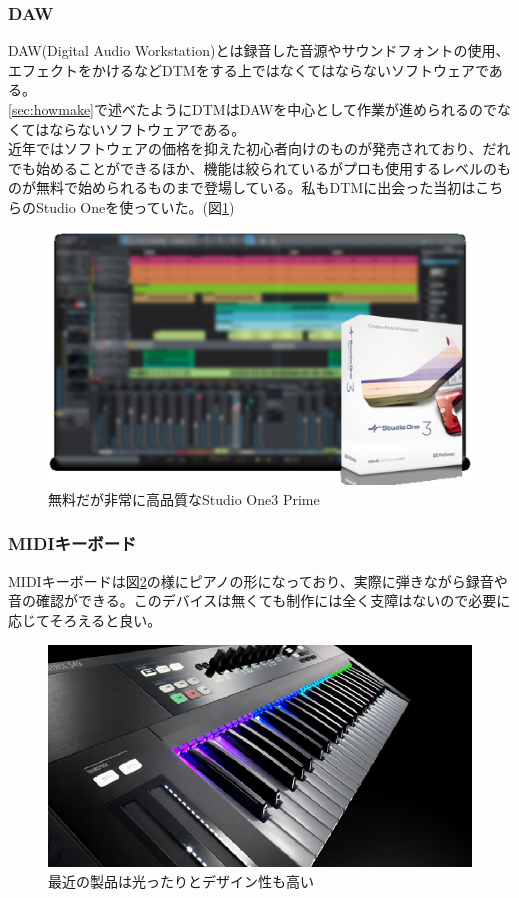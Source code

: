\documentclass[ams]{U-AizuGT}
\begin{document}
\subsubsection{DAW}
\label{sec:DAW}
DAW(Digital Audio Workstation)とは録音した音源やサウンドフォントの使用、エフェクトをかけるなどDTMをする上ではなくてはならないソフトウェアである。\\
\ref{sec:howmake}で述べたようにDTMはDAWを中心として作業が進められるのでなくてはならないソフトウェアである。\\
近年ではソフトウェアの価格を抑えた初心者向けのものが発売されており、だれでも始めることができるほか、機能は絞られているがプロも使用するレベルのものが無料で始められるものまで登場している。私もDTMに出会った当初はこちらのStudio Oneを使っていた。(図\ref{fig:freedaw})\\
\begin{figure}[htbp]
  \begin{center}
    \includegraphics[scale=0.2]{./prime_studio_one.eps}
    \caption{無料だが非常に高品質なStudio One3 Prime}
    \label{fig:freedaw}
  \end{center}
\end{figure}
\subsubsection{MIDIキーボード}
MIDIキーボードは図\ref{fig:key}の様にピアノの形になっており、実際に弾きながら録音や音の確認ができる。このデバイスは無くても制作には全く支障はないので必要に応じてそろえると良い。
\begin{figure}[htbp]
  \begin{center}
    \includegraphics[scale=0.55]{./key.eps}
    \caption{最近の製品は光ったりとデザイン性も高い}
    \label{fig:key}
  \end{center}
\end{figure}\\
\end{document}
